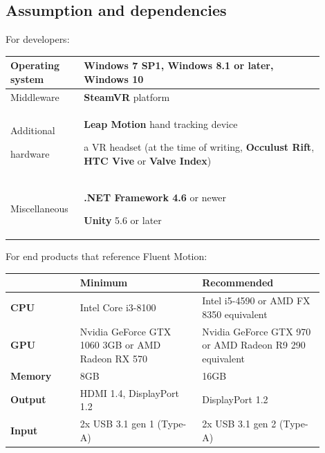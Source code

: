 \documentclass[12pt,a4paper,twoside]{report}
\begin{document}
\subsection{Assumption and dependencies}
For developers:
\begin{table}[h]
  \centering
  \begin{tabular}{| m{0.2\linewidth} | m{0.7\linewidth} |}
    \hline
    Operating system & \textbf{Windows 7 SP1}, \textbf{Windows 8.1} or later, \textbf{Windows 10} \\
    \hline
    Middleware & \textbf{SteamVR} platform \\
    \hline
    Additional 
    
    hardware & \textbf{Leap Motion} hand tracking device

    a VR headset (at the time of writing, \textbf{Occulust Rift}, \textbf{HTC Vive} or \textbf{Valve Index}) \\
    \hline
    Miscellaneous & \textbf{.NET Framework 4.6} or newer

    \textbf{Unity} 5.6 or later \\
    \hline
  \end{tabular}
\end{table}

For end products that reference Fluent Motion:

\begin{table}[h]
  \centering
  \begin{tabular}{| m{0.2\linewidth} | m{0.35\linewidth} | m{0.35\linewidth} |}
    \hline
    \rowcolor{lightgray} & Minimum & Recommended \\
    \hline
    \textbf{CPU} & Intel Core i3-8100 & Intel i5-4590 or AMD FX 8350 equivalent \\
    \hline
    \textbf{GPU} & Nvidia GeForce GTX 1060 3GB or AMD Radeon RX 570 & Nvidia GeForce GTX 970 or AMD Radeon R9 290 equivalent \\
    \hline
    \textbf{Memory} & 8GB & 16GB \\
    \hline
    \textbf{Output} & HDMI 1.4, DisplayPort 1.2 & DisplayPort 1.2 \\
    \hline
    \textbf{Input} & 2x USB 3.1 gen 1 (Type-A) & 2x USB 3.1 gen 2 (Type-A) \\
    \hline    
  \end{tabular}
\end{table}
\end{document}
